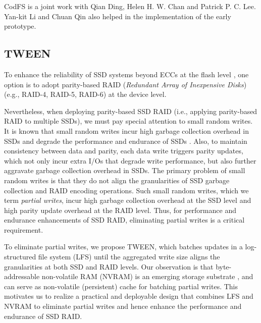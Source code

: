 CodFS is a joint work with Qian Ding, Helen H. W. Chan and Patrick P. C. Lee.
Yan-kit Li and Chuan Qin also helped in the implementation of the early
prototype.

\subsection{TWEEN}


To enhance the reliability of SSD systems beyond ECCs at the flash
level \cite{mielke08,grupp09,grupp12}, one option is to adopt 
parity-based RAID (\textit{Redundant Array of Inexpensive Disks})
\cite{patterson88} (e.g., RAID-4, RAID-5, RAID-6) at the device level. 

Nevertheless, when deploying parity-based SSD RAID (i.e., applying
parity-based RAID to multiple SSDs), we must pay special attention to small
random writes.  It is known that small random writes incur high garbage
collection overhead in SSDs and degrade the performance and endurance of SSDs
\cite{kim08,chen09,min12}.  Also, to maintain consistency between data and
parity, each data write triggers parity updates, which not only incur extra
I/Os that degrade write performance, but also further aggravate garbage
collection overhead in SSDs.  The primary problem of small random writes is
that they do not align the granularities of SSD garbage collection and RAID
encoding operations.  Such small random writes, which we term 
{\em partial writes}, incur high garbage collection overhead at the SSD level
and high parity update overhead at the RAID level.  Thus, for performance and
endurance enhancements of SSD RAID, eliminating partial writes is a critical
requirement. 

To eliminate partial writes, we propose TWEEN, which batches updates in a
log-structured file system (LFS) \cite{rosenblum92} until the aggregated write
size aligns the granularities at both SSD and RAID levels.  Our observation is
that byte-addressable non-volatile RAM (NVRAM) is an emerging storage substrate
\cite{jung10,venkataraman11,zhou09,qiu13,lee14}, and can serve as non-volatile
(persistent) cache for batching partial writes. This motivates us to realize a
practical and deployable design that combines LFS and NVRAM to eliminate partial
writes and hence enhance the performance and endurance of SSD RAID. 

